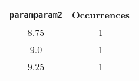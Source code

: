 \begin{longtable}{|c|c|}
\hline
\textbf{\texttt{paramparam2}} & \textbf{Occurrences} \\
\hline
8.75 & 1 \\
\hline
9.0 & 1 \\
\hline
9.25 & 1 \\
\hline
\end{longtable}